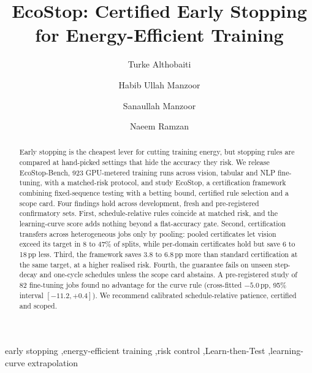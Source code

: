 \documentclass[3p,twocolumn,10pt]{elsarticle}
\theoremstyle{definition}
\begin{document}
\begin{frontmatter}

\title{EcoStop: Certified Early Stopping for Energy-Efficient Training}

\author[1]{Turke Althobaiti}
\author[2]{Habib Ullah Manzoor}
\author[3]{Sanaullah Manzoor}
\author[2]{Naeem Ramzan}


\begin{abstract}
Early stopping is the cheapest lever for cutting training energy, but stopping rules are compared at hand-picked settings that hide the accuracy they risk. We release EcoStop-Bench, 923 GPU-metered training runs across vision, tabular and NLP fine-tuning, with a matched-risk protocol, and study EcoStop, a certification framework combining fixed-sequence testing with a betting bound, certified rule selection and a scope card. Four findings hold across development, fresh and pre-registered confirmatory sets. First, schedule-relative rules coincide at matched risk, and the learning-curve score adds nothing beyond a flat-accuracy gate. Second, certification transfers across heterogeneous jobs only by pooling: pooled certificates let vision exceed its target in 8 to 47\% of splits, while per-domain certificates hold but save 6 to 18\,pp less. Third, the framework saves 3.8 to 6.8\,pp more than standard certification at the same target, at a higher realised risk. Fourth, the guarantee fails on unseen step-decay and one-cycle schedules unless the scope card abstains. A pre-registered study of 82 fine-tuning jobs found no advantage for the curve rule (cross-fitted $-5.0$\,pp, 95\% interval $[-11.2,+0.4]$). We recommend calibrated schedule-relative patience, certified and scoped.
\end{abstract}

\begin{keyword}
early stopping \sep energy-efficient training \sep risk control \sep Learn-then-Test \sep learning-curve extrapolation
\end{keyword}

\end{frontmatter}
\end{document}
